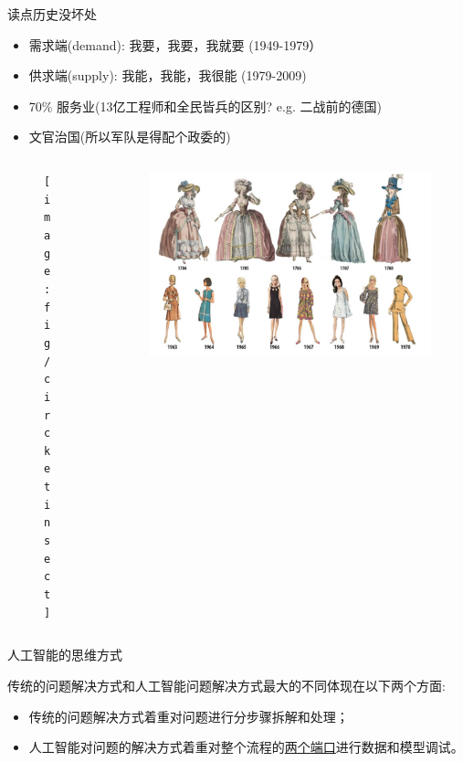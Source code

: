 \documentclass[handout]{beamer}
\begin{document}
\begin{frame}{读点历史没坏处}
	\begin{itemize}
		\item 需求端(demand): 我要，我要，我就要 (1949-1979）
		\item 供求端(supply): 我能，我能，我很能 (1979-2009)
		\item 70\% 服务业(13亿工程师和全民皆兵的区别? e.g. 二战前的德国)
		\item 文官治国(所以军队是得配个政委的)
	\end{itemize}
\begin{columns}
	\begin{column}{0.5\textwidth}
		\begin{figure}[H]
			\centering
			\texttt{[image: fig/circketinsect]}
		\end{figure}
	\end{column}
	\begin{column}{0.5\textwidth}
			\begin{figure}[H]
		\centering
		\includegraphics[width=\textwidth]{fig/fashionevolv}
	\end{figure}
	\end{column}
\end{columns}
\end{frame}

\begin{frame}{人工智能的思维方式}

传统的问题解决方式和人工智能问题解决方式最大的不同体现在以下两个方面:
	\begin{itemize}
	\setlength\itemsep{1em}
		\item 传统的问题解决方式着重对问题进行分步骤拆解和处理；
		\item 人工智能对问题的解决方式着重对整个流程的\underline{两个端口}进行数据和模型调试。
	\end{itemize}	
\end{frame}
\end{document}
